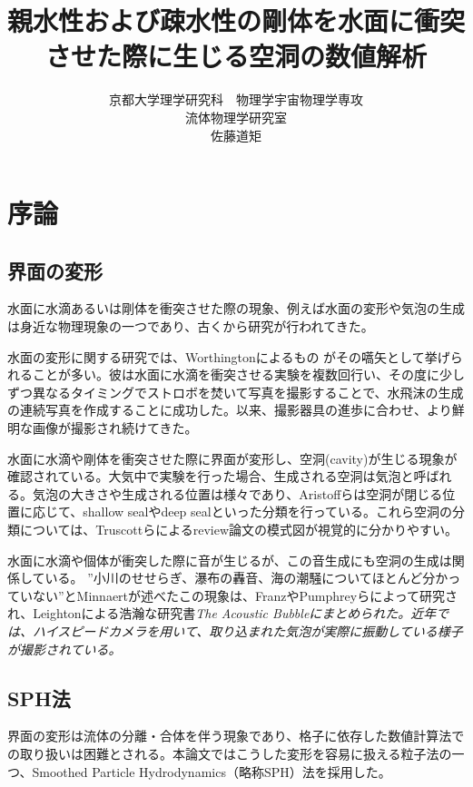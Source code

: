 \documentclass[]{jsarticle}
\begin{document}
\title{親水性および疎水性の剛体を水面に衝突させた際に生じる空洞の数値解析}
\author{京都大学理学研究科　物理学宇宙物理学専攻\\流体物理学研究室\\佐藤道矩}
\maketitle
\newpage

\tableofcontents
\newpage
\section{序論}
\subsection{界面の変形}
水面に水滴あるいは剛体を衝突させた際の現象、例えば水面の変形や気泡の生成は身近な物理現象の一つであり、古くから研究が行われてきた。

水面の変形に関する研究では、Worthingtonによるもの \cite{Worthington1908}がその嚆矢として挙げられることが多い。彼は水面に水滴を衝突させる実験を複数回行い、その度に少しずつ異なるタイミングでストロボを焚いて写真を撮影することで、水飛沫の生成の連続写真を作成することに成功した。以来、撮影器具の進歩に合わせ、より鮮明な画像が撮影され続けてきた。

水面に水滴や剛体を衝突させた際に界面が変形し、空洞(cavity)が生じる現象が確認されている。大気中で実験を行った場合、生成される空洞は気泡と呼ばれる。気泡の大きさや生成される位置は様々であり、Aristoffらは空洞が閉じる位置に応じて、shallow sealやdeep sealといった分類を行っている\cite{Aristoff2009}。これら空洞の分類については、Truscottらによるreview論文\cite{Truscott2014}の模式図が視覚的に分かりやすい。

水面に水滴や個体が衝突した際に音が生じるが、この音生成にも空洞の生成は関係している。
”小川のせせらぎ、瀑布の轟音、海の潮騒についてほとんど分かっていない”とMinnaert\cite{minnaert1933xvi}が述べたこの現象は、Franz\cite{Franz1959}やPumphrey\cite{Pumphrey1990}らによって研究され、Leightonによる浩瀚な研究書\it{The Acoustic Bubble}\rm\cite{leightonacoustic}にまとめられた。近年では、ハイスピードカメラを用いて、取り込まれた気泡が実際に振動している様子が撮影されている\cite{Phillips2018}。

\subsection{SPH法}
界面の変形は流体の分離・合体を伴う現象であり、格子に依存した数値計算法での取り扱いは困難とされる。本論文ではこうした変形を容易に扱える粒子法の一つ、Smoothed Particle Hydrodynamics（略称SPH）法を採用した。
\end{document}
